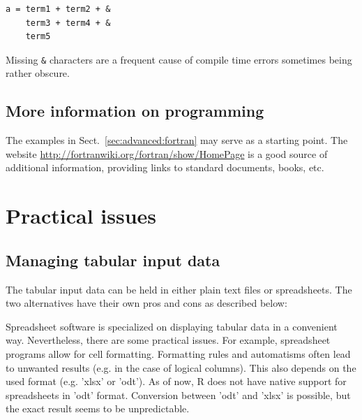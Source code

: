\documentclass[onecolumn]{article}
\begin{document}
\begin{shaded}
\begin{small}
\begin{verbatim}
a = term1 + term2 + &
    term3 + term4 + &
    term5
\end{verbatim}
\end{small}
\end{shaded}

Missing \verb|&| characters are a frequent cause of compile time errors sometimes being rather obscure.

\subsection{More information on  programming}

The examples in Sect.~\ref{sec:advanced:fortran} may serve as a starting point. The website \url{http://fortranwiki.org/fortran/show/HomePage} is a good source of additional information, providing links to standard documents, books, etc.


\section{Practical issues} \label{sec:practical}

\subsection{Managing tabular input data}

The tabular input data can be held in either plain text files or spreadsheets. The two alternatives have their own pros and cons as described below:

Spreadsheet software is specialized on displaying tabular data in a convenient way. Nevertheless, there are some practical issues. For example, spreadsheet programs allow for cell formatting. Formatting rules and automatisms often lead to unwanted results (e.g. in the case of logical columns). This also depends on the used format (e.g. 'xlsx' or 'odt'). As of now, R does not have native support for spreadsheets in 'odt' format. Conversion between 'odt' and 'xlsx' is possible, but the exact result seems to be unpredictable.
\end{document}

